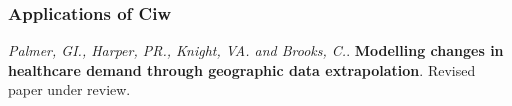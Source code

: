 \documentclass[xcolor={table}]{beamer}
\begin{document}
\begin{frame}
\begin{center}

\end{center}
\end{frame}

\begin{frame}
\frametitle{Applications of Ciw}
\begin{center}

\end{center}
\scriptsize{\textcolor{textorange}{\textit{Palmer, GI., Harper, PR., Knight, VA. and Brooks, C.}. \textbf{Modelling changes in healthcare demand through geographic data extrapolation}. Revised paper under review.}}
\end{frame}

\frame{\titlepage}
\end{document}
